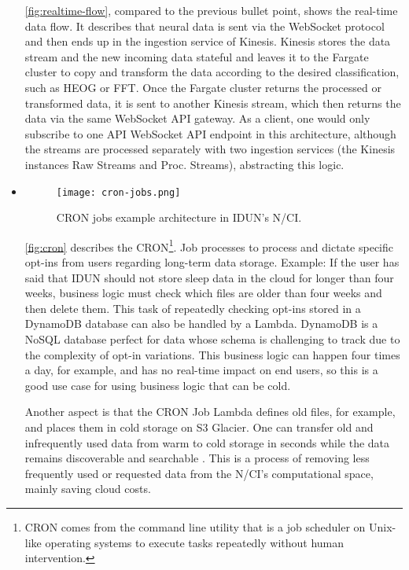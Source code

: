 \begin{itemize}
        \autoref{fig:realtime-flow}, compared to the previous bullet point, shows the real-time data flow. It describes that neural data is sent via the WebSocket protocol and then ends up in the ingestion service of Kinesis. Kinesis stores the data stream and the new incoming data stateful and leaves it to the Fargate cluster to copy and transform the data according to the desired classification, such as HEOG or FFT. Once the Fargate cluster returns the processed or transformed data, it is sent to another Kinesis stream, which then returns the data via the same WebSocket API gateway. As a client, one would only subscribe to one API WebSocket API endpoint in this architecture, although the streams are processed separately with two ingestion services (the Kinesis instances Raw Streams and Proc. Streams), abstracting this logic.

  \item \begin{figure}[!ht]
          \centering
          \hspace*{0.4in}
          \texttt{[image: cron-jobs.png]}
          \caption{CRON jobs example architecture in IDUN's N/CI.}
          \label{fig:cron}
        \end{figure}

        \autoref{fig:cron} describes the CRON\footnote{CRON comes from the command line utility that is a job scheduler on Unix-like operating systems to execute tasks repeatedly without human intervention.}. Job processes to process and dictate specific opt-ins from users regarding long-term data storage. Example: If the user has said that IDUN should not store sleep data in the cloud for longer than four weeks, business logic must check which files are older than four weeks and then delete them. This task of repeatedly checking opt-ins stored in a DynamoDB database can also be handled by a Lambda. DynamoDB is a NoSQL database perfect for data whose schema is challenging to track due to the complexity of opt-in variations. This business logic can happen four times a day, for example, and has no real-time impact on end users, so this is a good use case for using business logic that can be cold.

        Another aspect is that the CRON Job Lambda defines old files, for example, and places them in cold storage on S3 Glacier. One can transfer old and infrequently used data from warm to cold storage in seconds while the data remains discoverable and searchable \citep{sayed_introducing_2021}. This is a process of removing less frequently used or requested data from the N/CI's computational space, mainly saving cloud costs.


\end{itemize}
